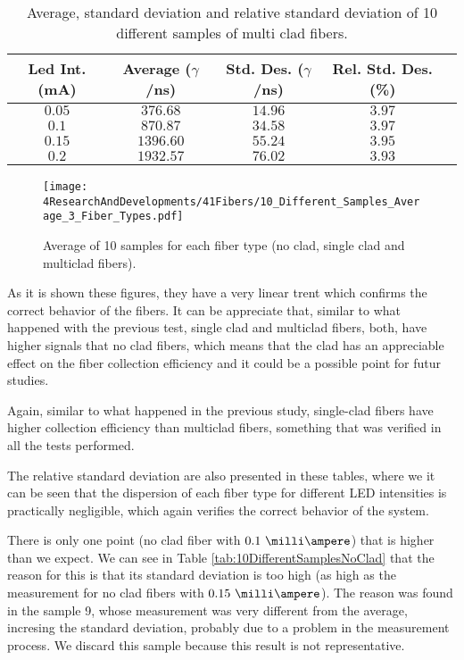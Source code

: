 \begin{table}[htbp]
\begin{center}
\begin{tabular}{|c|c|c|c|c|}
\hline
Led Int. (mA) & Average ($\gamma$/ns) & Std. Des. ($\gamma$/ns) & Rel. Std. Des. (\%)\\
\hline \hline \hline
$0.05$ & $376.68$ & $14.96$ & $3.97$ \\ \hline
$0.1$ & $870.87$ & $34.58$ & $3.97$ \\ \hline
$0.15$ & $1396.60$ & $55.24$ & $3.95$ \\ \hline
$0.2$ & $1932.57$ & $76.02$ & $3.93$ \\ \hline
\end{tabular}
\caption{Average, standard deviation and relative standard deviation of 10 different samples of multi clad fibers.}
\label{tab:10DifferentSamplesMultiClad}
\end{center}
\end{table}

\begin{figure}[h]
\centering
\texttt{[image: 4ResearchAndDevelopments/41Fibers/10\_Different\_Samples\_Average\_3\_Fiber\_Types.pdf]}
\caption{Average of 10 samples for each fiber type (no clad, single clad and multiclad fibers).\label{fig:AveregeThreeFiberTypes}}
\end{figure}

As it is shown these figures, they have a very linear trent which confirms the correct behavior of the fibers. It can be appreciate that, similar to what happened with the previous test, single clad and multiclad fibers, both, have higher signals that no clad fibers, which means that the clad has an appreciable effect on the fiber collection efficiency and it could be a possible point for futur studies. 

Again, similar to what happened in the previous study, single-clad fibers have higher collection efficiency than multiclad fibers, something that was verified in all the tests performed.

The relative standard deviation are also presented in these tables, where we it can be seen that the dispersion of each fiber type for different LED intensities is practically negligible, which again verifies the correct behavior of the system. 

There is only one point (no clad fiber with $0.1~\milli\ampere $) that is higher than we expect. We can see in Table \ref{tab:10DifferentSamplesNoClad} that the reason for this is that its standard deviation is too high (as high as the measurement for no clad fibers with $0.15~\milli\ampere$). The reason was found in the sample 9, whose measurement was very different from the average, incresing the standard deviation, probably due to a problem in the measurement process. We discard this sample because this result is not representative.

